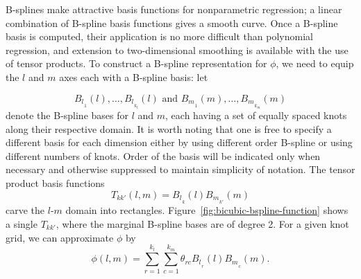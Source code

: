 B-splines make attractive basis functions for nonparametric regression; a linear combination of B-spline basis functions gives a smooth curve. Once a B-spline basis is computed, their application is no more difficult than polynomial regression, and extension to two-dimensional smoothing is available with the use of tensor products. To construct a B-spline representation for $\phi$, we need to equip the $l$ and $m$ axes each with a B-spline basis: let

\[
{B_l}_{_1}\left(l\right),\dots, {B_l}_{_{k_l}}\left(l\right)  \mbox{ and } {B_m}_{_1}\left(m\right),\dots, {B_m}_{_{k_m}}\left(m\right)
\]
\noindent
denote the B-spline bases for $l$ and $m$, each having a set of equally spaced knots along their respective domain. It is worth noting that one is free to specify a different basis for each dimension either by using different order B-spline or using different numbers of knots. Order of the basis will be indicated only when necessary and otherwise suppressed to maintain simplicity of notation. The tensor product basis functions
\begin{equation*}
T_{kk'}\left(l,m\right) = {B_l}_{_k}\left(l\right){B_m}_{_{k'}}\left(m\right)
\end{equation*}
\noindent
carve the $l$-$m$ domain into rectangles. Figure~\ref{fig:bicubic-bspline-function} shows a single $T_{kk'}$, where the marginal B-spline bases are of degree 2. For a given knot grid, we can approximate $\phi$ by
\begin{equation} \label{eq:tensor-product-bspline-expansion-phi}
\phi\left(l,m\right) = \sum_{r=1}^{k_l} \sum_{c=1}^{k_m} \theta_{rc} {B_l}_{_r}\left(l\right) {B_m}_{_c}\left(m\right). 
\end{equation}
\noindent
%
%

